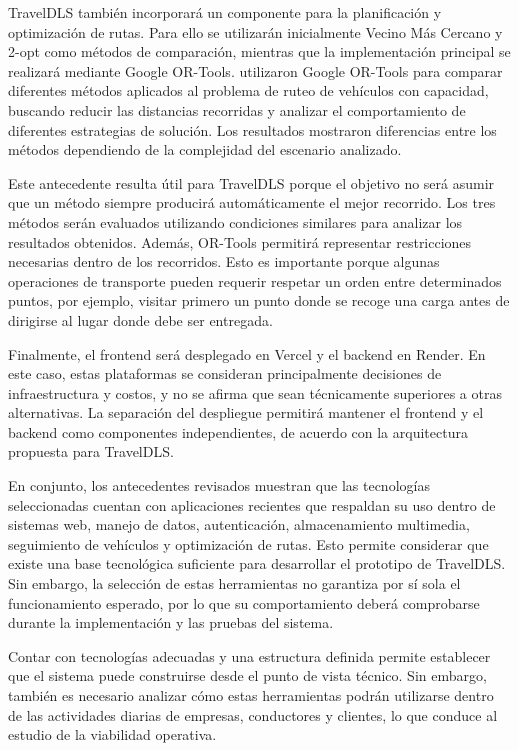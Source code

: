 TravelDLS también incorporará un componente para la planificación y optimización de rutas. Para ello se utilizarán inicialmente Vecino Más Cercano y 2-opt como métodos de comparación, mientras que la implementación principal se realizará mediante Google OR-Tools. \textcite{muriyatmoko2024ortools} utilizaron Google OR-Tools para comparar diferentes métodos aplicados al problema de ruteo de vehículos con capacidad, buscando reducir las distancias recorridas y analizar el comportamiento de diferentes estrategias de solución. Los resultados mostraron diferencias entre los métodos dependiendo de la complejidad del escenario analizado.

Este antecedente resulta útil para TravelDLS porque el objetivo no será asumir que un método siempre producirá automáticamente el mejor recorrido. Los tres métodos serán evaluados utilizando condiciones similares para analizar los resultados obtenidos. Además, OR-Tools permitirá representar restricciones necesarias dentro de los recorridos. Esto es importante porque algunas operaciones de transporte pueden requerir respetar un orden entre determinados puntos, por ejemplo, visitar primero un punto donde se recoge una carga antes de dirigirse al lugar donde debe ser entregada.

Finalmente, el frontend será desplegado en Vercel y el backend en Render. En este caso, estas plataformas se consideran principalmente decisiones de infraestructura y costos, y no se afirma que sean técnicamente superiores a otras alternativas. La separación del despliegue permitirá mantener el frontend y el backend como componentes independientes, de acuerdo con la arquitectura propuesta para TravelDLS.

En conjunto, los antecedentes revisados muestran que las tecnologías seleccionadas cuentan con aplicaciones recientes que respaldan su uso dentro de sistemas web, manejo de datos, autenticación, almacenamiento multimedia, seguimiento de vehículos y optimización de rutas. Esto permite considerar que existe una base tecnológica suficiente para desarrollar el prototipo de TravelDLS. Sin embargo, la selección de estas herramientas no garantiza por sí sola el funcionamiento esperado, por lo que su comportamiento deberá comprobarse durante la implementación y las pruebas del sistema.

Contar con tecnologías adecuadas y una estructura definida permite establecer que el sistema puede construirse desde el punto de vista técnico. Sin embargo, también es necesario analizar cómo estas herramientas podrán utilizarse dentro de las actividades diarias de empresas, conductores y clientes, lo que conduce al estudio de la viabilidad operativa.


